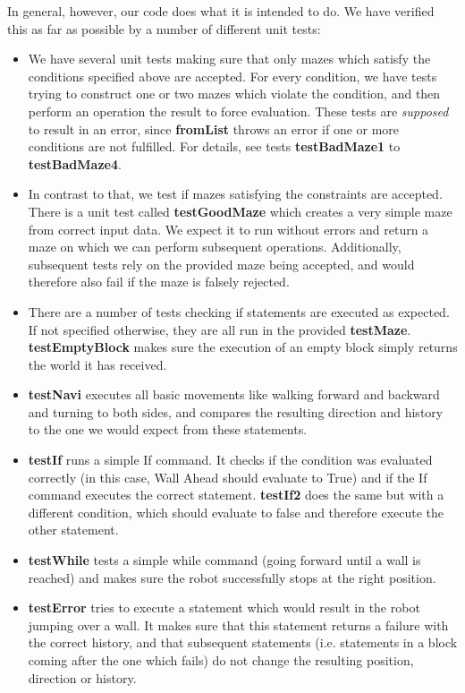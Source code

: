 \documentclass[a4paper]{article}
\begin{document}
In general, however, our code does what it is intended to do. We have verified this as far as possible by a number of different unit tests:
\begin{itemize}
  \item We have several unit tests making sure that only mazes which satisfy the conditions specified above are accepted. For every condition, we have tests trying to construct one or two mazes which violate the condition, and then perform an operation the result to force evaluation. These tests are \emph{supposed} to result in an error, since \textbf{fromList} throws an error if one or more conditions are not fulfilled. For details, see tests \textbf{testBadMaze1} to \textbf{testBadMaze4}.
  \item In contrast to that, we test if mazes satisfying the constraints are accepted. There is a unit test called \textbf{testGoodMaze} which creates a very simple maze from correct input data. We expect it to run without errors and return a maze on which we can perform subsequent operations. Additionally, subsequent tests rely on the provided maze being accepted, and would therefore also fail if the maze is falsely rejected.
  \item There are a number of tests checking if statements are executed as expected. If not specified otherwise, they are all run in the provided \textbf{testMaze}. \textbf{testEmptyBlock} makes sure the execution of an empty block simply returns the world it has received.
  \item \textbf{testNavi} executes all basic movements like walking forward and backward and turning to both sides, and compares the resulting direction and history to the one we would expect from these statements.
  \item \textbf{testIf} runs a simple If command. It checks if the condition was evaluated correctly (in this case, Wall Ahead should evaluate to True) and if the If command executes the correct statement. \textbf{testIf2} does the same but with a different condition, which should evaluate to false and therefore execute the other statement.
  \item \textbf{testWhile} tests a simple while command (going forward until a wall is reached) and makes sure the robot successfully stops at the right position.
  \item \textbf{testError} tries to execute a statement which would result in the robot jumping over a wall. It makes sure that this statement returns a failure with the correct history, and that subsequent statements (i.e. statements in a block coming after the one which fails) do not change the resulting position, direction or history.
\end{itemize}
\end{document}
